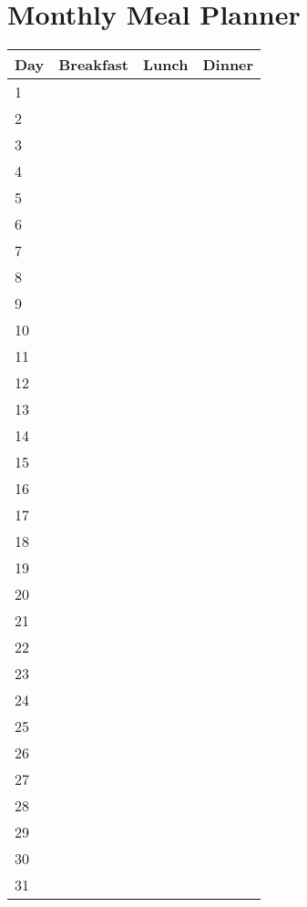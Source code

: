 \chapter*{Monthly Meal Planner}
\renewcommand{\arraystretch}{1.2}
\begin{center}
\begin{tabular}{|l|l|l|l|}
\hline
\textbf{Day} & \textbf{Breakfast} & \textbf{Lunch} & \textbf{Dinner}\\
\hline
1 & & & \\
2 & & & \\
3 & & & \\
4 & & & \\
5 & & & \\
6 & & & \\
7 & & & \\
8 & & & \\
9 & & & \\
10 & & & \\
11 & & & \\
12 & & & \\
13 & & & \\
14 & & & \\
15 & & & \\
16 & & & \\
17 & & & \\
18 & & & \\
19 & & & \\
20 & & & \\
21 & & & \\
22 & & & \\
23 & & & \\
24 & & & \\
25 & & & \\
26 & & & \\
27 & & & \\
28 & & & \\
29 & & & \\
30 & & & \\
31 & & & \\
\hline
\end{tabular}
\end{center}

